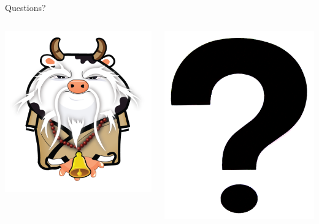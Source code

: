 \documentclass[aspectratio=169]{beamer}
\begin{document}
\begin{frame}{Questions?}
    \begin{columns}
        \begin{column}[c]{0.5\textwidth}
            \includegraphics[height=0.9\textheight]{images/holycow.png}
        \end{column}
        \begin{column}[c]{0.5\textwidth}
            \includegraphics[height=0.8\textheight]{images/questions.png}

\end{column}
\end{columns}
\end{frame}
\end{document}
